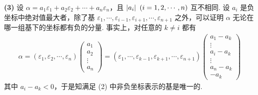 \begin{solution}
\textbf{(3)} 设 $\alpha=a_1\varepsilon_1+a_2\varepsilon_2+\cdots+a_n\varepsilon_n$，且 $\left|a_i\right|\ (i=1,2,\cdots,n)$ 互不相同. 设 $a_i$ 是负坐标中绝对值最大者，除了基 $\varepsilon_1,\cdots,\varepsilon_{i-1},\varepsilon_{i+1},\cdots,\varepsilon_{n+1}$ 之外，可以证明 $\alpha$ 无论在哪一组基下的坐标都有负的分量. 事实上，对任意的 $k\ne i$ 都有
\begin{align*}
\alpha=(\varepsilon_1,\varepsilon_2,\cdots,\varepsilon_n)
\begin{pmatrix}
  a_1\\a_2\\\vdots\\a_n
\end{pmatrix}
=(\varepsilon_1,\cdots,\varepsilon_{k-1},\varepsilon_{k+1},\cdots,\varepsilon_{n+1})
\begin{pmatrix}
  a_1-a_k\\
  \vdots\\
  a_i-a_k\\
  \vdots\\
  a_n-a_k\\
  -a_k
\end{pmatrix}
\end{align*}
其中 $a_i-a_k<0$，于是知满足 (2) 中非负坐标表示的基是唯一的.
\end{solution}

